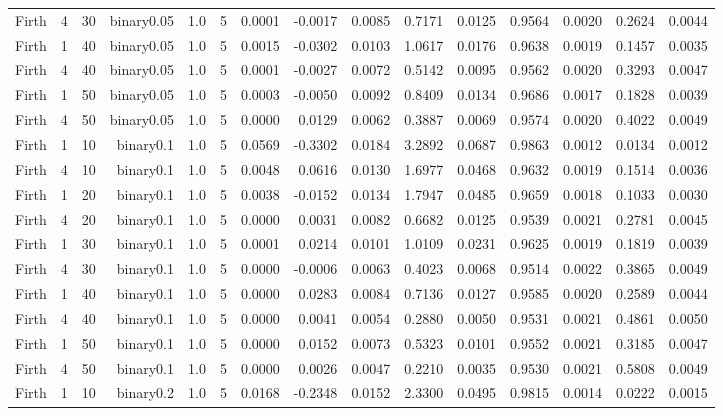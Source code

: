 \begin{longtable}{rrrrrrrrrrrrrrr}
  Firth & 4 & 30 & binary0.05 & 1.0 & 5 & 0.0001 & -0.0017 & 0.0085 & 0.7171 & 0.0125 & 0.9564 & 0.0020 & 0.2624 & 0.0044 \\ 
  Firth & 1 & 40 & binary0.05 & 1.0 & 5 & 0.0015 & -0.0302 & 0.0103 & 1.0617 & 0.0176 & 0.9638 & 0.0019 & 0.1457 & 0.0035 \\ 
  Firth & 4 & 40 & binary0.05 & 1.0 & 5 & 0.0001 & -0.0027 & 0.0072 & 0.5142 & 0.0095 & 0.9562 & 0.0020 & 0.3293 & 0.0047 \\ 
  Firth & 1 & 50 & binary0.05 & 1.0 & 5 & 0.0003 & -0.0050 & 0.0092 & 0.8409 & 0.0134 & 0.9686 & 0.0017 & 0.1828 & 0.0039 \\ 
  Firth & 4 & 50 & binary0.05 & 1.0 & 5 & 0.0000 & 0.0129 & 0.0062 & 0.3887 & 0.0069 & 0.9574 & 0.0020 & 0.4022 & 0.0049 \\ 
  Firth & 1 & 10 & binary0.1 & 1.0 & 5 & 0.0569 & -0.3302 & 0.0184 & 3.2892 & 0.0687 & 0.9863 & 0.0012 & 0.0134 & 0.0012 \\ 
  Firth & 4 & 10 & binary0.1 & 1.0 & 5 & 0.0048 & 0.0616 & 0.0130 & 1.6977 & 0.0468 & 0.9632 & 0.0019 & 0.1514 & 0.0036 \\ 
  Firth & 1 & 20 & binary0.1 & 1.0 & 5 & 0.0038 & -0.0152 & 0.0134 & 1.7947 & 0.0485 & 0.9659 & 0.0018 & 0.1033 & 0.0030 \\ 
  Firth & 4 & 20 & binary0.1 & 1.0 & 5 & 0.0000 & 0.0031 & 0.0082 & 0.6682 & 0.0125 & 0.9539 & 0.0021 & 0.2781 & 0.0045 \\ 
  Firth & 1 & 30 & binary0.1 & 1.0 & 5 & 0.0001 & 0.0214 & 0.0101 & 1.0109 & 0.0231 & 0.9625 & 0.0019 & 0.1819 & 0.0039 \\ 
  Firth & 4 & 30 & binary0.1 & 1.0 & 5 & 0.0000 & -0.0006 & 0.0063 & 0.4023 & 0.0068 & 0.9514 & 0.0022 & 0.3865 & 0.0049 \\ 
  Firth & 1 & 40 & binary0.1 & 1.0 & 5 & 0.0000 & 0.0283 & 0.0084 & 0.7136 & 0.0127 & 0.9585 & 0.0020 & 0.2589 & 0.0044 \\ 
  Firth & 4 & 40 & binary0.1 & 1.0 & 5 & 0.0000 & 0.0041 & 0.0054 & 0.2880 & 0.0050 & 0.9531 & 0.0021 & 0.4861 & 0.0050 \\ 
  Firth & 1 & 50 & binary0.1 & 1.0 & 5 & 0.0000 & 0.0152 & 0.0073 & 0.5323 & 0.0101 & 0.9552 & 0.0021 & 0.3185 & 0.0047 \\ 
  Firth & 4 & 50 & binary0.1 & 1.0 & 5 & 0.0000 & 0.0026 & 0.0047 & 0.2210 & 0.0035 & 0.9530 & 0.0021 & 0.5808 & 0.0049 \\ 
  Firth & 1 & 10 & binary0.2 & 1.0 & 5 & 0.0168 & -0.2348 & 0.0152 & 2.3300 & 0.0495 & 0.9815 & 0.0014 & 0.0222 & 0.0015 \\ 

\end{longtable}
